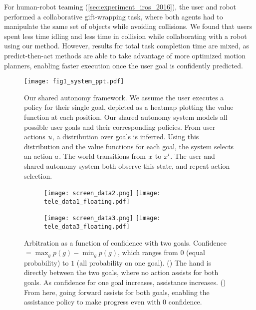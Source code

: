For human-robot teaming (\cref{sec:experiment_iros_2016}), the user and robot performed a collaborative gift-wrapping task, where both agents had to manipulate the same set of objects while avoiding collisions. We found that users spent less time idling and less time in collision while collaborating with a robot using our method. However, results for total task completion time are mixed, as predict-then-act methods are able to take advantage of more optimized motion planners, enabling faster execution once the user goal is confidently predicted. 





\begin{figure}[t]
\centering
\texttt{[image: fig1\_system\_ppt.pdf]}
\caption{ Our shared autonomy framework. We assume the user executes a policy for their single goal, depicted as a heatmap plotting the value function at each position. Our shared autonomy system models all possible user goals and their corresponding policies. From user actions $u$, a distribution over goals is inferred. Using this distribution and the value functions for each goal, the system selects an action $a$. The world transitions from $x$ to $x'$. The user and shared autonomy system both observe this state, and repeat action selection.}
 \label{fig:robot_human_model}
\end{figure} 

\begin{figure}[t]
\centering
 \begin{subfigure}{0.240\textwidth}
   \centering 
   \hspace*{1mm} \texttt{[image: screen\_data2.png]}
   \hspace*{-2mm} \texttt{[image: tele\_data1\_floating.pdf]} \hfill
   \caption{}
 \label{fig:teledata_cen}
 \end{subfigure}
 \hfill
 \begin{subfigure}{0.240\textwidth}
   \centering
   \hspace*{1mm} \texttt{[image: screen\_data3.png]}
   \hspace*{-1mm}\texttt{[image: tele\_data3\_floating.pdf]} \hfill
  \caption{}
 \label{fig:teledata_back}
 \end{subfigure}
 \caption{Arbitration as a function of confidence with two goals. Confidence $=\max_g p(g) - \min_g p(g)$, which ranges from $0$ (equal probability) to $1$ (all probability on one goal). () The hand is directly between the two goals, where no action assists for both goals. As confidence for one goal increases, assistance increases. () From here, going forward assists for both goals, enabling the assistance policy to make progress even with $0$ confidence.}
\label{fig:teledata}
\end{figure} 




